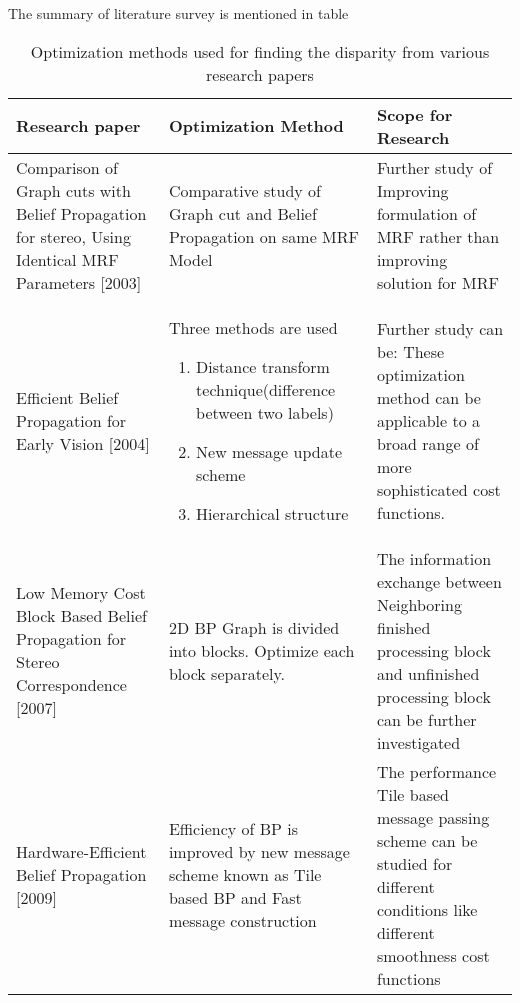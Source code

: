 


\begin{table}[h]
\caption{Optimization methods used for finding the disparity from various research papers}
\centering
The summary of literature survey is mentioned in table
\begin{tabular}{|p{1in}|p{2in}|p{2in}|}

  \hline
  Research paper & Optimization Method & Scope for Research \\
  \hline
  Comparison of Graph cuts with Belief Propagation for stereo, Using Identical MRF Parameters
[2003]
 & Comparative study of Graph cut and Belief Propagation on same MRF Model& Further study of
Improving formulation of MRF rather than improving solution for MRF
 \\
  \hline
  Efficient Belief Propagation for Early Vision
[2004]
 &Three methods are used\begin{enumerate}
     \item Distance transform technique(difference between two labels)
     \item New message update scheme
     \item Hierarchical structure
   \end{enumerate}
  & Further study can be:
These optimization method can be
applicable to a broad range of more sophisticated cost functions.
 \\
  \hline
  Low Memory Cost Block Based Belief Propagation for Stereo Correspondence
[2007]
 & 2D BP Graph is divided into blocks. Optimize each block separately. & The information exchange between Neighboring finished processing block and unfinished processing block can be  further investigated \\
 \hline
 Hardware-Efficient Belief Propagation
[2009]
 & Efficiency of BP is improved by new message scheme known as Tile based BP and Fast message construction & The performance Tile based message passing scheme can be studied for different conditions  like different smoothness cost functions \\

\end{tabular}
\end{table}
